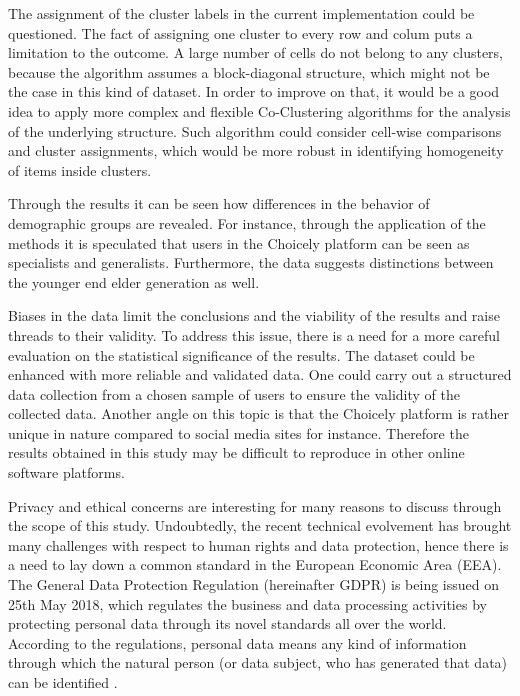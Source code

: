 The assignment of the cluster labels in the current implementation could be questioned. The fact of assigning one cluster to every row and colum puts a limitation to the outcome. A large number of cells do not belong to any clusters, because the algorithm assumes a block-diagonal structure, which might not be the case in this kind of dataset. In order to improve on that, it would be a good idea to apply more complex and flexible Co-Clustering algorithms for the analysis of the underlying structure. Such algorithm could consider cell-wise comparisons and cluster assignments, which would be more robust in identifying homogeneity of items inside clusters. 

Through the results it can be seen how differences in the behavior of demographic groups are revealed. For instance, through the application of the methods it is speculated that users in the Choicely platform can be seen as specialists and generalists. Furthermore, the data suggests distinctions between the younger end elder generation as well. 

Biases in the data limit the conclusions and the viability of the results and raise threads to their validity. To address this issue, there is a need for a more careful evaluation on the statistical significance of the results. The dataset could be enhanced with more reliable and validated data. One could carry out a structured data collection from a chosen sample of users to ensure the validity of the collected data. Another angle on this topic is that the Choicely platform is rather unique in nature compared to social media sites for instance. Therefore the results obtained in this study may be difficult to reproduce in other online software platforms.

Privacy and ethical concerns are interesting for many reasons to discuss through the scope of this study. Undoubtedly, the recent technical evolvement has brought many challenges with respect to human rights and data protection, hence there is a need to lay down a common standard in the European Economic Area (EEA). The General Data Protection Regulation (hereinafter GDPR) \cite{gdpr} is being issued on 25th May 2018, which regulates the business and data processing activities by protecting personal data through its novel standards all over the world. According to the regulations, personal data means any kind of information through which the natural person (or data subject, who has generated that data) can be identified \cite{gdpr}. 

